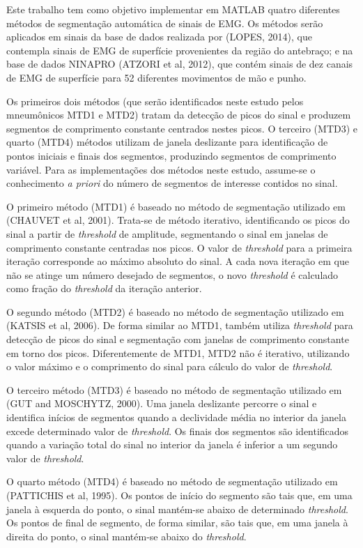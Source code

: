 \documentclass[
	12pt,				%
	openright,			%
	oneside,
	a4paper,			%
	english,			%
	francais,			%
	spanish,			%
	brazil				%
	]{abntex2}
\begin{document}
	Este trabalho tem como objetivo implementar em MATLAB quatro diferentes métodos de segmentação automática de sinais de EMG. Os métodos serão aplicados em sinais da base de dados realizada por (LOPES, 2014), que contempla sinais de EMG de superfície provenientes da região do antebraço; e na base de dados NINAPRO (ATZORI et al, 2012), que contém sinais de dez canais de EMG de superfície para 52 diferentes movimentos de mão e punho.
	
	Os primeiros dois métodos (que serão identificados neste estudo pelos mneumônicos MTD1 e MTD2) tratam da detecção de picos do sinal e produzem segmentos de comprimento constante centrados nestes picos. O terceiro (MTD3) e quarto (MTD4) métodos utilizam de janela deslizante para identificação de pontos iniciais e finais dos segmentos, produzindo segmentos de comprimento variável. Para as implementações dos métodos neste estudo, assume-se o conhecimento \emph{a priori} do número de segmentos de interesse contidos no sinal.
	
	O primeiro método (MTD1) é baseado no método de segmentação utilizado em (CHAUVET et al, 2001). Trata-se de método iterativo, identificando os picos do sinal a partir de \emph{threshold} de amplitude, segmentando o sinal em janelas de comprimento constante centradas nos picos. O valor de \emph{threshold} para a primeira iteração corresponde ao máximo absoluto do sinal. A cada nova iteração em que não se atinge um número desejado de segmentos, o novo \emph{threshold} é calculado como fração do \emph{threshold} da iteração anterior.
	
	O segundo método (MTD2) é baseado no método de segmentação utilizado em (KATSIS et al, 2006). De forma similar ao MTD1, também utiliza \emph{threshold} para detecção de picos do sinal e segmentação com janelas de comprimento constante em torno dos picos. Diferentemente de MTD1, MTD2 não é iterativo, utilizando o valor máximo e o comprimento do sinal para cálculo do valor de \emph{threshold}.
	
	O terceiro método (MTD3) é baseado no método de segmentação utilizado em (GUT and MOSCHYTZ, 2000). Uma janela deslizante percorre o sinal e identifica inícios de segmentos quando a declividade média no interior da janela excede determinado valor de \emph{threshold}. Os finais dos segmentos são identificados quando a variação total do sinal no interior da janela é inferior a um segundo valor de \emph{threshold}.
	
	O quarto método (MTD4) é baseado no método de segmentação utilizado em (PATTICHIS et al, 1995). Os pontos de início do segmento são tais que, em uma janela à esquerda do ponto, o sinal mantém-se abaixo de determinado \emph{threshold}. Os pontos de final de segmento, de forma similar, são tais que, em uma janela à direita do ponto, o sinal mantém-se abaixo do \emph{threshold}.
	
\end{document}
